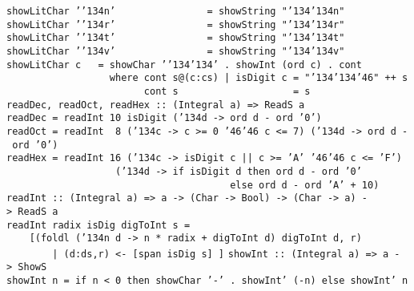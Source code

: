 \mbox{\tt showLitChar\ '{\char'134}n'\ \ \ \ \ \ \ \ \ \ \ \ \ \ \ \ =\ showString\ "{\char'134}{\char'134}n"}\\
\mbox{\tt showLitChar\ '{\char'134}r'\ \ \ \ \ \ \ \ \ \ \ \ \ \ \ \ =\ showString\ "{\char'134}{\char'134}r"}\\
\mbox{\tt showLitChar\ '{\char'134}t'\ \ \ \ \ \ \ \ \ \ \ \ \ \ \ \ =\ showString\ "{\char'134}{\char'134}t"}\\
\mbox{\tt showLitChar\ '{\char'134}v'\ \ \ \ \ \ \ \ \ \ \ \ \ \ \ \ =\ showString\ "{\char'134}{\char'134}v"}\\
\mbox{\tt showLitChar\ c\ \ \ =\ showChar\ '{\char'134}{\char'134}'\ .\ showInt\ (ord\ c)\ .\ cont}\\
\mbox{\tt \ \ \ \ \ \ \ \ \ \ \ \ \ \ \ \ \ \ where\ cont\ s@(c:cs)\ |\ isDigit\ c\ =\ "{\char'134}{\char'134}{\char'46}"\ ++\ s}\\
\mbox{\tt \ \ \ \ \ \ \ \ \ \ \ \ \ \ \ \ \ \ \ \ \ \ \ \ cont\ s\ \ \ \ \ \ \ \ \ \ \ \ \ \ \ \ \ \ \ \ =\ s}
%
\eprogB\noindent\bprogB
\mbox{\tt readDec,\ readOct,\ readHex\ ::\ (Integral\ a)\ =>\ ReadS\ a}\\
\mbox{\tt readDec\ =\ readInt\ 10\ isDigit\ ({\char'134}d\ ->\ ord\ d\ -\ ord\ '0')}\\
\mbox{\tt readOct\ =\ readInt\ \ 8\ ({\char'134}c\ ->\ c\ >=\ 0\ {\char'46}{\char'46}\ c\ <=\ 7)\ ({\char'134}d\ ->\ ord\ d\ -\ ord\ '0')}\\
\mbox{\tt readHex\ =\ readInt\ 16\ ({\char'134}c\ ->\ isDigit\ c\ ||\ c\ >=\ 'A'\ {\char'46}{\char'46}\ c\ <=\ 'F')}\\
\mbox{\tt \ \ \ \ \ \ \ \ \ \ \ \ \ \ \ \ \ \ \ ({\char'134}d\ ->\ if\ isDigit\ d\ then\ ord\ d\ -\ ord\ '0'}\\
\mbox{\tt \ \ \ \ \ \ \ \ \ \ \ \ \ \ \ \ \ \ \ \ \ \ \ \ \ \ \ \ \ \ \ \ \ \ \ \ \ \ \ else\ ord\ d\ -\ ord\ 'A'\ +\ 10)}
%
%
%
\eprogB\noindent\bprogB
\mbox{\tt readInt\ ::\ (Integral\ a)\ =>\ a\ ->\ (Char\ ->\ Bool)\ ->\ (Char\ ->\ a)\ ->\ ReadS\ a}\\
\mbox{\tt readInt\ radix\ isDig\ digToInt\ s\ =}\\
\mbox{\tt \ \ \ \ [(foldl\ ({\char'134}n\ d\ ->\ n\ *\ radix\ +\ digToInt\ d)\ digToInt\ d,\ r)}\\
\mbox{\tt \ \ \ \ \ \ \ \ |\ (d:ds,r)\ <-\ [span\ isDig\ s]\ ]}
%
\eprogB\noindent\bprogB
\mbox{\tt showInt\ ::\ (Integral\ a)\ =>\ a\ ->\ ShowS}\\
\mbox{\tt showInt\ n\ =\ if\ n\ <\ 0\ then\ showChar\ '-'\ .\ showInt'\ (-n)\ else\ showInt'\ n}\\
